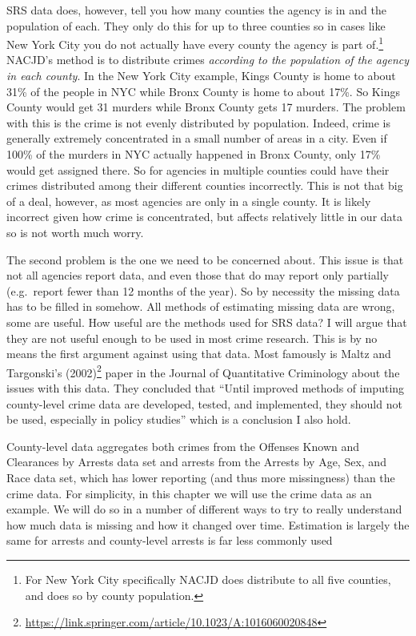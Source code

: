 \documentclass[
]{krantz}
\renewcommand{\href}[2]{#2\footnote{\url{#1}}}
\begin{document}
SRS data does, however, tell you how many counties the
agency is in and the population of each. They only do this
for up to three counties so in cases like New York City you
do not actually have every county the agency is part
of.\footnote{For New York City specifically NACJD does
  distribute to all five counties, and does so by county
  population.} NACJD's method is to distribute crimes
\emph{according to the population of the agency in each
county}. In the New York City example, Kings County is home
to about 31\% of the people in NYC while Bronx County is
home to about 17\%. So Kings County would get 31 murders
while Bronx County gets 17 murders. The problem with this is
the crime is not evenly distributed by population. Indeed,
crime is generally extremely concentrated in a small number
of areas in a city. Even if 100\% of the murders in NYC
actually happened in Bronx County, only 17\% would get
assigned there. So for agencies in multiple counties could
have their crimes distributed among their different counties
incorrectly. This is not that big of a deal, however, as
most agencies are only in a single county. It is likely
incorrect given how crime is concentrated, but affects
relatively little in our data so is not worth much worry.

The second problem is the one we need to be concerned about.
This issue is that not all agencies report data, and even
those that do may report only partially (e.g.~report fewer
than 12 months of the year). So by necessity the missing
data has to be filled in somehow. All methods of estimating
missing data are wrong, some are useful. How useful are the
methods used for SRS data? I will argue that they are not
useful enough to be used in most crime research. This is by
no means the first argument against using that data. Most
famously is
\href{https://link.springer.com/article/10.1023/A:1016060020848}{Maltz
and Targonski's (2002)} paper in the Journal of Quantitative
Criminology about the issues with this data. They concluded
that ``Until improved methods of imputing county-level crime
data are developed, tested, and implemented, they should not
be used, especially in policy studies'' which is a
conclusion I also hold.

County-level data aggregates both crimes from the Offenses
Known and Clearances by Arrests data set and arrests from the
Arrests by Age, Sex, and Race data set, which has lower
reporting (and thus more missingness) than the crime data.
For simplicity, in this chapter we will use the crime data
as an example. We will do so in a number of different ways
to try to really understand how much data is missing and how
it changed over time. Estimation is largely the same for
arrests and county-level arrests is far less commonly used
\end{document}
